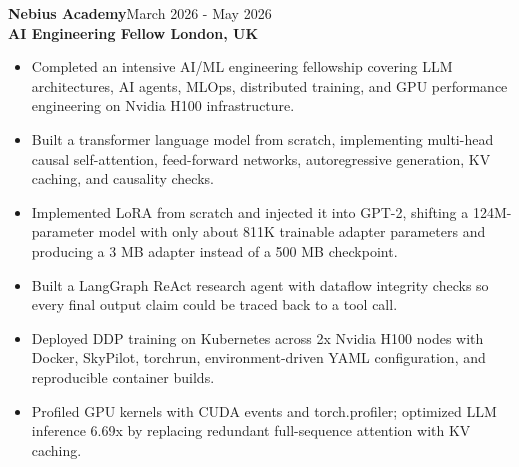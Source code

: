 \documentclass[10pt,a4paper]{article}
\newcommand{\entry}[4]{%
  \textbf{\color{secondarycolor}#1}\hfill {\small\color{mutedcolor}#2}\\
  \textbf{#3}\hfill {\small\color{mutedcolor}#4}\\[-5pt]
}
\begin{document}
\entry{Nebius Academy}{March 2026 - May 2026}{AI Engineering Fellow \textbar{} London, UK}{}
\begin{itemize}
  \item Completed an intensive AI/ML engineering fellowship covering LLM architectures, AI agents, MLOps, distributed training, and GPU performance engineering on Nvidia H100 infrastructure.
  \item Built a transformer language model from scratch, implementing multi-head causal self-attention, feed-forward networks, autoregressive generation, KV caching, and causality checks.
  \item Implemented LoRA from scratch and injected it into GPT-2, shifting a 124M-parameter model with only about 811K trainable adapter parameters and producing a 3 MB adapter instead of a 500 MB checkpoint.
  \item Built a LangGraph ReAct research agent with dataflow integrity checks so every final output claim could be traced back to a tool call.
  \item Deployed DDP training on Kubernetes across 2x Nvidia H100 nodes with Docker, SkyPilot, torchrun, environment-driven YAML configuration, and reproducible container builds.
  \item Profiled GPU kernels with CUDA events and torch.profiler; optimized LLM inference 6.69x by replacing redundant full-sequence attention with KV caching.
\end{itemize}
\end{document}
